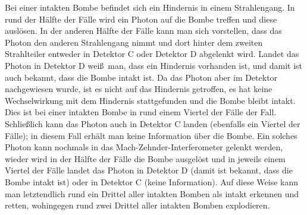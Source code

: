 Bei einer intakten Bombe befindet sich ein Hindernis in einem Strahlengang. In rund der H\"alfte der F\"alle
wird ein Photon auf die Bombe treffen und diese ausl\"osen. In der anderen H\"alfte der F\"alle 
kann man sich vorstellen, dass das Photon den anderen Strahlengang nimmt und dort hinter
dem zweiten Strahlteiler entweder in Detektor C oder Detektor D abgelenkt wird. Landet das Photon
in Detektor D wei\ss\ man, dass ein Hindernis vorhanden ist, und damit ist auch bekannt, dass die
Bombe intakt ist. Da das Photon aber im Detektor nachgewiesen wurde, ist es nicht auf das Hindernis
getroffen, es hat keine Wechselwirkung mit dem Hindernis stattgefunden und die Bombe bleibt intakt. 
Dies ist bei einer intakten Bombe in rund einem Viertel der F\"alle der Fall. Schlie\ss lich kann das 
Photon auch in Detektor C landen (ebenfalls ein Viertel der F\"alle); in diesem Fall erh\"alt man keine 
Information \"uber die Bombe. Ein solches Photon kann nochmals in das Mach-Zehnder-Interferometer
gelenkt werden, wieder wird in der H\"alfte der F\"alle die Bombe ausgel\"ost und in jeweils einem Viertel der
F\"alle landet das Photon in Detektor D (damit ist bekannt, dass die Bombe intakt ist) oder in Detektor
C (keine Information). Auf diese Weise kann man letztendlich rund ein Drittel aller intakten Bomben als
intakt erkennen und retten, wohingegen rund zwei Drittel aller intakten Bomben explodieren. 

